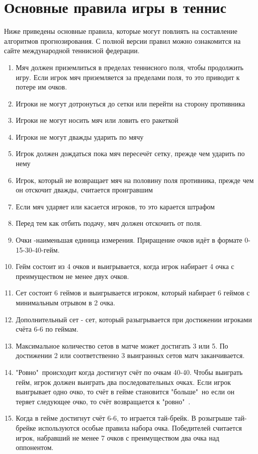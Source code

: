 \section{Основные правила игры в теннис}
Ниже приведены основные правила, которые могут повлиять на составление алгоритмов прогнозирования. С полной версии правил можно ознакомится на сайте международной теннисной федерации\cite{Book04}.
 \begin{enumerate}
	\item  Мяч должен приземлиться в пределах теннисного поля, чтобы продолжить игру. Если игрок мяч приземляется за пределами поля, то это приводит к потере им очков.
	\item Игроки не могут дотронуться до сетки или перейти на сторону противника
	\item Игроки не могут носить мяч или ловить его ракеткой
	\item Игроки не могут дважды ударить по мячу
    \item Игрок должен дождаться пока мяч пересечёт сетку, прежде чем ударить по нему
    \item Игрок, который не возвращает мяч на половину поля противника, прежде чем он отскочит дважды, считается проигравшим
    \item Если мяч ударяет или касается игроков, то это карается штрафом
    \item Перед тем как отбить подачу, мяч должен отскочить от поля.
    \item Очки -наименьшая единица измерения. Приращение очков идёт в формате 0-15-30-40-гейм.
    \item Гейм состоит из 4 очков и выигрывается, когда игрок набирает 4 очка с преимуществом не менее двух очков.
    \item Сет состоит 6 геймов и выигрывается игроком, который набирает 6 геймов 
 	 с минимальным отрывом в 2 очка.
 	 \item Дополнительный сет - сет, который разыгрывается при достижении игроками счёта 6-6 по геймам. 
  	\item Максимальное количество сетов в матче может достигать 3 или 5. По достижении 2 или соответственно 3 выигранных сетов матч заканчивается.
  	\item "Ровно"\ происходит когда достигнут счёт по очкам 40-40. Чтобы выиграть гейм, игрок должен выиграть два последовательных очках. Если игрок выигрывает одно очко, то счёт в гейме становится "больше"\, но если он теряет следующее очко, то счёт возвращается к "ровно"\ .
  	\item Когда в гейме достигнут счёт 6-6, то играется тай-брейк. В розыгрыше тай-брейке используются особые правила набора очка. Победителей считается игрок, набравший не менее 7 очков с преимуществом два очка над оппонентом.
\end{enumerate}
